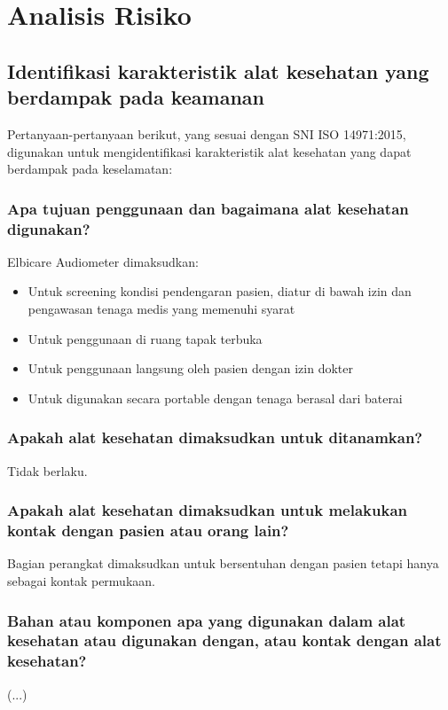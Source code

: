 \documentclass[11pt,a4paper,twoside,draft,onecolumn]{book}
\begin{document}
	\newpage
	
	\chapter{Analisis Risiko}
		\section{Identifikasi karakteristik alat kesehatan yang berdampak pada keamanan}
		Pertanyaan-pertanyaan berikut, yang sesuai dengan SNI ISO 14971:2015, digunakan untuk mengidentifikasi karakteristik alat kesehatan yang dapat berdampak pada keselamatan:
			\subsection{Apa tujuan penggunaan dan bagaimana alat kesehatan digunakan?}
			Elbicare Audiometer dimaksudkan:
			\begin{itemize}
				\item Untuk screening kondisi pendengaran pasien, diatur di bawah izin dan pengawasan tenaga medis yang memenuhi syarat
				\item Untuk penggunaan di ruang tapak terbuka
				\item Untuk penggunaan langsung oleh pasien dengan izin dokter
				\item Untuk digunakan secara portable dengan tenaga berasal dari baterai 
			\end{itemize}
			
			\subsection{Apakah alat kesehatan dimaksudkan untuk ditanamkan?}
			Tidak berlaku.
			
			\subsection{Apakah alat kesehatan dimaksudkan untuk melakukan kontak dengan pasien atau orang lain?}
			Bagian perangkat dimaksudkan untuk bersentuhan dengan pasien tetapi hanya sebagai kontak permukaan.
			
			\subsection{Bahan atau komponen apa yang digunakan dalam alat kesehatan atau digunakan dengan, atau kontak dengan alat kesehatan?}
			(...)
			
\end{document}
